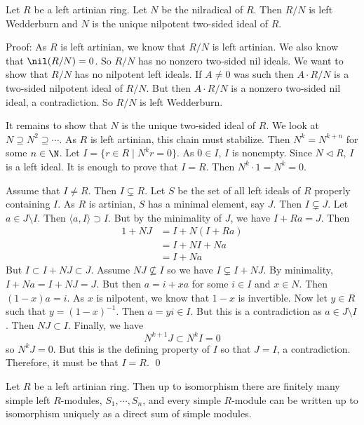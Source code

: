 \begin{thm}
Let $R$ be a left artinian ring. Let $N$ be the nilradical of $R$. Then $R/N$ is left Wedderburn and $N$ is the unique nilpotent two-sided ideal of $R$.
\end{thm}

Proof: As $R$ is left artinian, we know that $R/N$ is left artinian. We also know that $\nil(R/N)=0$. So $R/N$ has no nonzero two-sided nil ideals. We want to show that $R/N$ has no nilpotent left ideals. If $A \neq 0$ was such then $A \cdot R/N$ is a two-sided nilpotent ideal of $R/N$. But then $A \cdot R/N$ is a nonzero two-sided nil ideal, a contradiction. So $R/N$ is left Wedderburn. 

It remains to show that $N$ is the unique two-sided ideal of $R$. We look at $N \supseteq N^2 \supseteq \cdots$. As $R$ is left artinian, this chain must stabilize. Then $N^k=N^{k+n}$ for some $n \in \N$. Let $I=\{r \in R\;|\; N^kr=0\}$. As $0 \in I$, $I$ is nonempty. Since $N \lhd R$, $I$ is a left ideal. It is enough to prove that $I=R$. Then $N^k \cdot 1=N^k=0$. 

Assume that $I \neq R$. Then $I \subsetneq R$. Let $S$ be the set of all left ideals of $R$ properly containing $I$. As $R$ is artinian, $S$ has a minimal element, say $J$. Then $I \subsetneq J$. Let $a \in J \setminus I$. Then $\langle a,I \rangle \supset I$. But by the minimality of $J$, we have $I+Ra=J$. Then 
\[
\begin{split}
1+NJ&=I+N(I+Ra) \\
&=I+NI+Na \\
&=I+Na
\end{split}
\]
But $I \subset I+NJ \subset J$. Assume $NJ \not\subseteq I$ so we have $I \subsetneq I+NJ$. By minimality, $I+Na=I+NJ=J$. But then $a=i+xa$ for some $i \in I$ and $x \in N$. Then $(1-x)a=i$. As $x$ is nilpotent, we know that $1-x$ is invertible. Now let $y \in R$ such that $y=(1-x)^{-1}$. Then $a=yi \in I$. But this is a contradiction as $a \in J \setminus I$. Then $NJ \subset I$. Finally, we have
\[
N^{k+1}J \subset N^kI=0
\]
so $N^kJ=0$. But this is the defining property of $I$ so that $J=I$, a contradiction. Therefore, it must be that $I=R$. \qed \\

\begin{thm}
Let $R$ be a left artinian ring. Then up to isomorphism there are finitely many simple left $R$-modules, $S_1,\cdots,S_n$, and every simple $R$-module can be written up to isomorphism uniquely as a direct sum of simple modules. 
\end{thm}

